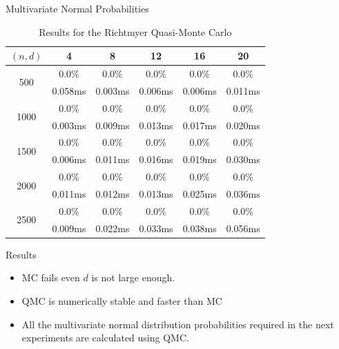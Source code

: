\begin{frame}{Multivariate Normal Probabilities} 
	\begin{table}[!h]
		\centering
		{
			\begin{tabular}{@{}cccccc@{}}
				\toprule
				$(n, d)$ 				  & 4 		& 8 	  & 12 		& 16 	  & 20	 \\ \midrule
				\multirow{2}{*}{500}  & 0.0\%   & 0.0\%   & 0.0\%   & 0.0\%   & 0.0\% \\
									& 0.058ms & 0.003ms & 0.006ms & 0.006ms & 0.011ms \\
				\multirow{2}{*}{1000} & 0.0\%   & 0.0\%   & 0.0\%   & 0.0\%   & 0.0\% \\
									& 0.003ms & 0.009ms & 0.013ms & 0.017ms & 0.020ms \\
				\multirow{2}{*}{1500} & 0.0\%   & 0.0\%   & 0.0\%   & 0.0\%   & 0.0\% \\
									& 0.006ms & 0.011ms & 0.016ms & 0.019ms & 0.030ms \\
				\multirow{2}{*}{2000} & 0.0\%   & 0.0\%   & 0.0\%   & 0.0\%   & 0.0\% \\
									& 0.011ms & 0.012ms & 0.013ms & 0.025ms & 0.036ms \\
				\multirow{2}{*}{2500} & 0.0\%   & 0.0\%   & 0.0\%   & 0.0\%   & 0.0\% \\
									& 0.009ms & 0.022ms & 0.033ms & 0.038ms & 0.056ms \\ \bottomrule
			\end{tabular}%
		}
		\caption{Results for the Richtmyer Quasi-Monte Carlo}
		\label{tab:results_qmc}
	\end{table}

\end{frame}

\begin{frame}{\subsecname}
	\begin{block}{Results}
		\begin{itemize}
			\item MC fails even $d$ is not large enough. 
			\item QMC is numerically stable and faster than MC 
			\item All the multivariate normal distribution probabilities required in the next experiments are calculated using QMC.
		\end{itemize}
	\end{block}
\end{frame}

